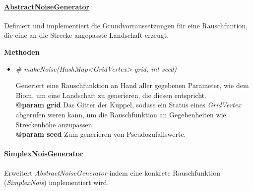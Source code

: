             
            
            \paragraph{\underline{AbstractNoiseGenerator}} \mbox{}\par
            Definiert und implementiert die Grundvorraussetzungen für eine Rauschfuntion, 
            die eine an die Strecke angepasste Landschaft erzeugt.\par
            
            \textbf{Methoden}					
            \begin{itemize}
                \item  \textit{\# makeNoise(HashMap<GridVertex> grid, int seed)}
                    \begin{leftbar}[0.9\linewidth]
                        Generiert eine Rauschfunktion an Hand aller gegebenen Parameter, wie dem Biom, um eine Landschaft zu generieren,
                        die diesen entspricht.\\
                        \textbf{@param grid} Das Gitter der Kuppel, sodass ein Status eines \textit{GridVertex} abgerufen weren kann,
                            um die Rauschfunktion an Gegebenheiten wie Streckenhöhe anzupassen.\\
                        \textbf{@param seed} Zum generieren von Pseudozufallswerte.
                    \end{leftbar}  
            \end{itemize}



            

            \paragraph{\underline{SimplexNoisGenerator}} \mbox{}\par
            Erweitert \textit{AbstractNoiseGenerator} indem eine konkrete Rauschfunktion (\textit{SimplexNois}) implementiert wird.\par
            
